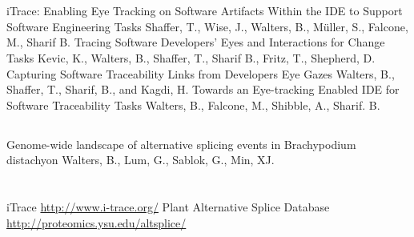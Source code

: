 \documentclass[8pt,a4paper]{moderncv}
\begin{document}
  \section{\textbf{\ignorespaces
                   }}
  \subsection{}
          {iTrace: Enabling Eye Tracking on Software Artifacts Within the IDE to Support Software Engineering Tasks}
          {Shaffer, T., Wise, J., Walters, B., M\"uller, S., Falcone, M., Sharif B.}
          {}{}{}
          {Tracing Software Developers’ Eyes and Interactions for Change Tasks}
          {Kevic, K., Walters, B., Shaffer, T., Sharif B., Fritz, T., Shepherd, D.}
          {}{}{}
          {Capturing Software Traceability Links from Developers Eye Gazes}
          {Walters, B., Shaffer, T., Sharif, B., and Kagdi, H.}
          {}{}{}
          {Towards an Eye-tracking Enabled IDE for Software Traceability Tasks}
          {Walters, B., Falcone, M., Shibble, A., Sharif. B.}
          {}{}{}
  \vspace{1mm}
  \subsection{}
          {Genome-wide landscape of alternative splicing events in Brachypodium distachyon}
          {Walters, B., Lum, G., Sablok, G., Min, XJ.}
          {}{}{}

  \pagebreak

  \section{\textbf{\ignorespaces
                   }}
          {iTrace}
          {\ignorespaces
           }
          {}{}{\url{http://www.i-trace.org/}}
          {Plant Alternative Splice Database}
          {\ignorespaces
           }
          {}{}{\url{http://proteomics.ysu.edu/altsplice/}}
\end{document}
